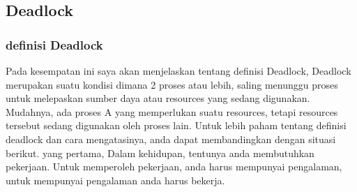 \subsection {Deadlock}
\subsubsection {definisi Deadlock}
Pada kesempatan ini saya akan menjelaskan tentang definisi Deadlock, Deadlock merupakan suatu kondisi dimana 2 proses atau lebih, saling menunggu proses untuk melepaskan sumber daya atau resources yang sedang digunakan. Mudahnya, ada proses A yang memperlukan suatu resources, tetapi resources tersebut sedang digunakan oleh proses lain. Untuk lebih paham tentang definisi deadlock dan cara mengatasinya, anda dapat membandingkan dengan situasi berikut. yang pertama, Dalam kehidupan, tentunya anda membutuhkan pekerjaan. Untuk memperoleh pekerjaan, anda harus mempunyai pengalaman, untuk mempunyai pengalaman anda harus bekerja.